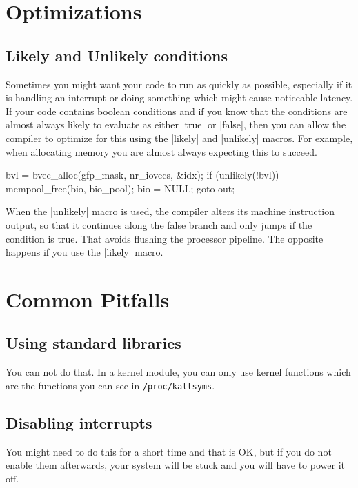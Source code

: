 \documentclass[10pt, oneside]{book}
\begin{document}

\section{Optimizations}
\label{sec:optimization}
\subsection{Likely and Unlikely conditions}
\label{sec:likely_unlikely}
Sometimes you might want your code to run as quickly as possible, especially if it is handling an interrupt or doing something which might cause noticeable latency.
If your code contains boolean conditions and if you know that the conditions are almost always likely to evaluate as either \cpp|true| or \cpp|false|,
then you can allow the compiler to optimize for this using the \cpp|likely| and \cpp|unlikely| macros.
For example, when allocating memory you are almost always expecting this to succeed.

\begin{code}
bvl = bvec_alloc(gfp_mask, nr_iovecs, &idx);
if (unlikely(!bvl)) {
    mempool_free(bio, bio_pool);
    bio = NULL;
    goto out;
}
\end{code}

When the \cpp|unlikely| macro is used, the compiler alters its machine instruction output, so that it continues along the false branch and only jumps if the condition is true.
That avoids flushing the processor pipeline.
The opposite happens if you use the \cpp|likely| macro.

\section{Common Pitfalls}
\label{sec:opitfall}

\subsection{Using standard libraries}
\label{sec:using_stdlib}
You can not do that.
In a kernel module, you can only use kernel functions which are the functions you can see in \verb|/proc/kallsyms|.

\subsection{Disabling interrupts}
\label{sec:disabling_interrupts}
You might need to do this for a short time and that is OK, but if you do not enable them afterwards, your system will be stuck and you will have to power it off.
\end{document}
